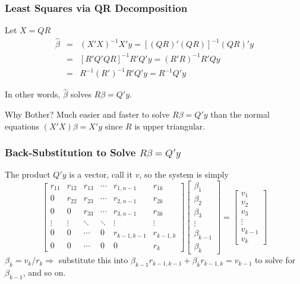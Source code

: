\begin{frame}
  \frametitle{Least Squares via QR Decomposition}
  \begin{block}{Let $X = QR$}
\begin{eqnarray*}
  \widehat{\beta} &=& (X'X)^{-1} X'y = \left[(QR)' (QR) \right]^{-1} (QR)' y\\
    &=&\left[ R' Q' Q R\right]^{-1} R'Q' y = (R'R)^{-1} R'Q y\\
    &=& R^{-1} (R')^{-1} R' Q'y = R^{-1} Q'y
\end{eqnarray*}

In other words, $\widehat{\beta}$ solves $R\beta = Q'y$.
\end{block}

\begin{block}{Why Bother?}
  Much easier and faster to solve $R\beta = Q'y$ than the normal equations $(X'X)\beta = X'y$ since $R$ is \alert{upper triangular}.
\end{block}
\end{frame}
\begin{frame}
  \frametitle{Back-Substitution to Solve $R\beta = Q'y$}

The product $Q'y$ is a vector, call it $v$, so the system is simply
  $$\left[
    \begin{array}
      {cccccc}
      r_{11} & r_{12}  & r_{13}& \cdots & r_{1,n-1} & r_{1k} \\
      0 & r_{22} & r_{23}&\cdots & r_{2,n-1} & r_{2k}\\
      0&  0 &  r_{33}& \cdots & r_{3,n-1} & r_{3k}\\  
      \vdots & \vdots & \ddots& \ddots & \vdots & \vdots\\
      0 & 0 & \cdots &0  & r_{k-1, k-1} & r_{k-1, k} \\
      0 & 0 & \cdots & 0 & 0 & r_{k}
    \end{array}
  \right] \left[ \begin{array}
    {ccc}
    \beta_1 \\ \beta_2 \\ \beta_3 \\ \vdots \\ \beta_{k-1} \\ \beta_k
  \end{array}\right] = \left[ \begin{array}
    {c}
    v_1  \\ v_2  \\ v_3 \\  \vdots \\ v_{k-1} \\ v_{k}
  \end{array}\right]
  $$
$\beta_k = v_k / r_k \Rightarrow$ substitute this into $\beta_{k-1} r_{k-1,k-1} + \beta_k r_{k-1,k} = v_{k-1}$ to solve for $\beta_{k-1}$, and so on.
\end{frame}
